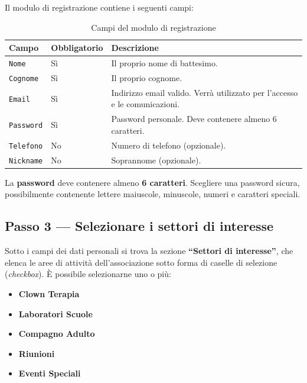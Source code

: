 \documentclass[a4paper,11pt,oneside]{book}
\newcommand{\campo}[1]{\texttt{#1}}
\begin{document}
Il modulo di registrazione contiene i seguenti campi:

\begin{table}[htbp]
\centering
\caption{Campi del modulo di registrazione}
\label{tab:campi-registrazione}
\begin{tabularx}{\textwidth}{l l X}
\toprule
\textbf{Campo} & \textbf{Obbligatorio} & \textbf{Descrizione} \\
\midrule
\campo{Nome}      & S\`i & Il proprio nome di battesimo. \\
\campo{Cognome}   & S\`i & Il proprio cognome. \\
\campo{Email}     & S\`i & Indirizzo email valido. Verr\`a utilizzato per l'accesso e le comunicazioni. \\
\campo{Password}  & S\`i & Password personale. Deve contenere almeno 6 caratteri. \\
\campo{Telefono}  & No  & Numero di telefono (opzionale). \\
\campo{Nickname}  & No  & Soprannome (opzionale). \\
\bottomrule
\end{tabularx}
\end{table}

\begin{warningbox}
La \textbf{password} deve contenere almeno \textbf{6 caratteri}. Scegliere una password sicura, possibilmente contenente lettere maiuscole, minuscole, numeri e caratteri speciali.
\end{warningbox}

\subsection{Passo 3 --- Selezionare i settori di interesse}

Sotto i campi dei dati personali si trova la sezione \textbf{``Settori di interesse''}, che elenca le aree di attivit\`a dell'associazione sotto forma di caselle di selezione (\textit{checkbox}). \`E possibile selezionarne uno o pi\`u:

\begin{itemize}[leftmargin=1.5em]
  \item \textbf{Clown Terapia}
  \item \textbf{Laboratori Scuole}
  \item \textbf{Compagno Adulto}
  \item \textbf{Riunioni}
  \item \textbf{Eventi Speciali}
\end{itemize}
\end{document}
